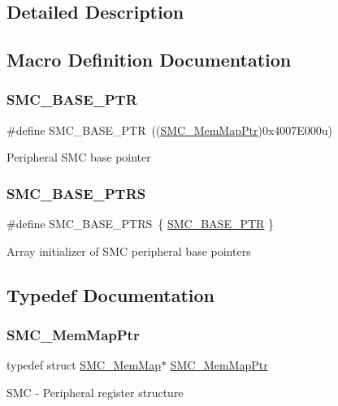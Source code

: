 \subsection{Detailed Description}


\subsection{Macro Definition Documentation}
\mbox{\label{group___s_m_c___peripheral_ga31b6c4571795341e6446800243313e56}} 
\subsubsection{\texorpdfstring{S\+M\+C\+\_\+\+B\+A\+S\+E\+\_\+\+P\+TR}{SMC\_BASE\_PTR}}
{\footnotesize\ttfamily \#define S\+M\+C\+\_\+\+B\+A\+S\+E\+\_\+\+P\+TR~((\hyperlink{group___s_m_c___peripheral_ga763f87a6b8ebab7acb6dde639e6a47c7}{S\+M\+C\+\_\+\+Mem\+Map\+Ptr})0x4007\+E000u)}

Peripheral S\+MC base pointer \mbox{\label{group___s_m_c___peripheral_gae583f3f0917ee513adcac36dd042a5f3}} 
\subsubsection{\texorpdfstring{S\+M\+C\+\_\+\+B\+A\+S\+E\+\_\+\+P\+T\+RS}{SMC\_BASE\_PTRS}}
{\footnotesize\ttfamily \#define S\+M\+C\+\_\+\+B\+A\+S\+E\+\_\+\+P\+T\+RS~\{ \hyperlink{group___s_m_c___peripheral_ga31b6c4571795341e6446800243313e56}{S\+M\+C\+\_\+\+B\+A\+S\+E\+\_\+\+P\+TR} \}}

Array initializer of S\+MC peripheral base pointers 

\subsection{Typedef Documentation}
\mbox{\label{group___s_m_c___peripheral_ga763f87a6b8ebab7acb6dde639e6a47c7}} 
\subsubsection{\texorpdfstring{S\+M\+C\+\_\+\+Mem\+Map\+Ptr}{SMC\_MemMapPtr}}
{\footnotesize\ttfamily typedef struct \hyperlink{struct_s_m_c___mem_map}{S\+M\+C\+\_\+\+Mem\+Map}$\ast$ \hyperlink{group___s_m_c___peripheral_ga763f87a6b8ebab7acb6dde639e6a47c7}{S\+M\+C\+\_\+\+Mem\+Map\+Ptr}}

S\+MC -\/ Peripheral register structure 